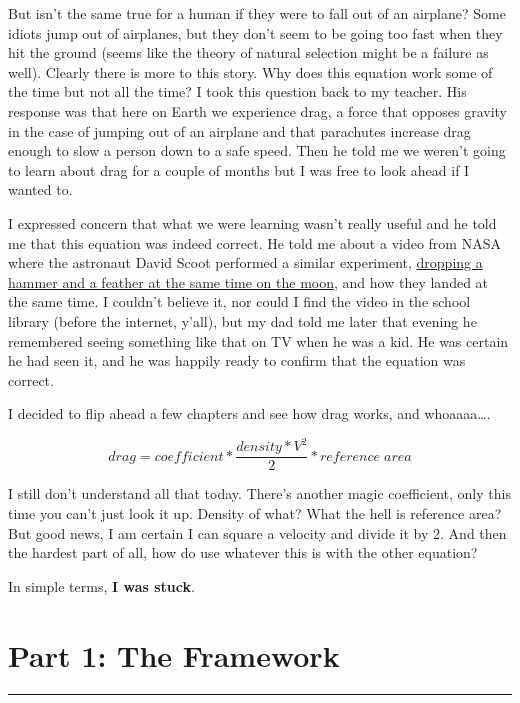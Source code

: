 \documentclass[]{book}
\begin{document}
But isn't the same true for a human if they were to fall out of an
airplane? Some idiots jump out of airplanes, but they don't seem to be
going too fast when they hit the ground (seems like the theory of
natural selection might be a failure as well). Clearly there is more to
this story. Why does this equation work some of the time but not all the
time? I took this question back to my teacher. His response was that
here on Earth we experience drag, a force that opposes gravity in the
case of jumping out of an airplane and that parachutes increase drag
enough to slow a person down to a safe speed. Then he told me we weren't
going to learn about drag for a couple of months but I was free to look
ahead if I wanted to.

I expressed concern that what we were learning wasn't really useful and
he told me that this equation was indeed correct. He told me about a
video from NASA where the astronaut David Scoot performed a similar
experiment,
\href{https://nssdc.gsfc.nasa.gov/planetary/lunar/apollo_15_feather_drop.html}{dropping
a hammer and a feather at the same time on the moon}, and how they
landed at the same time. I couldn't believe it, nor could I find the
video in the school library (before the internet, y'all), but my dad
told me later that evening he remembered seeing something like that on
TV when he was a kid. He was certain he had seen it, and he was happily
ready to confirm that the equation was correct.

I decided to flip ahead a few chapters and see how drag works, and
whoaaaa\ldots{}.

\[drag = coefficient * \frac{density * V^2}{2} * reference\;area\]

I still don't understand all that today. There's another magic
coefficient, only this time you can't just look it up. Density of what?
What the hell is reference area? But good news, I am certain I can
square a velocity and divide it by 2. And then the hardest part of all,
how do use whatever this is with the other equation?

In simple terms, \textbf{I was stuck}.

\chapter*{Part 1: The Framework}\label{part1}

\begin{center}\rule{0.5\linewidth}{0.5pt}\end{center}
\end{document}
